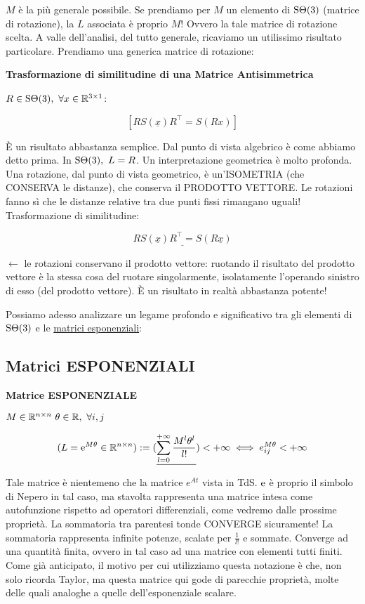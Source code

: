 $M$ è la più generale possibile. Se prendiamo per $M$ un elemento di $\operatorname{S\Theta}(3)$ (matrice di rotazione), la $L$ associata è proprio $M$! Ovvero la tale matrice di rotazione scelta. A valle dell'analisi, del tutto generale, ricaviamo un utilissimo risultato particolare. Prendiamo una generica matrice di rotazione:

\begin{corl}{\textbf{Trasformazione di similitudine di una Matrice Antisimmetrica}}

$R\in\operatorname{S\Theta}(3),\ \forall x\in\mathbb{R}^{3\times 1}$:

\[
	[RS(\underline{x})R^\top = S(Rx)]
\]

\end{corl}

\`E un risultato abbastanza semplice. Dal punto di vista algebrico è come abbiamo detto prima. In $\SO(3),\ L=R$. Un interpretazione geometrica è molto profonda. Una rotazione, dal punto di vista geometrico, è un'ISOMETRIA (che CONSERVA le distanze), che conserva il PRODOTTO VETTORE. Le rotazioni fanno sì che le distanze relative tra due punti fissi rimangano uguali! Trasformazione di similitudine:

\[
	\underline{RS(\underline{x})R^\top = S(R\underline{x})}
\]

$\leftarrow$ le rotazioni conservano il prodotto vettore: ruotando il risultato del prodotto vettore è la stessa cosa del ruotare singolarmente, isolatamente l'operando sinistro di esso (del prodotto vettore). \`E un risultato in realtà abbastanza potente!

Possiamo adesso analizzare un legame profondo e significativo tra gli elementi di $\operatorname{S\Theta}(3)$ e le \underline{matrici esponenziali}:

\subsection{Matrici ESPONENZIALI}

\begin{defn}{\textbf{Matrice ESPONENZIALE}}

$M\in\mathbb{R}^{n\times n}\ \theta\in\mathbb{R},\ \forall i,j$

\[
	(L = \mathop{}\!\mathrm{e}^{M\theta}\in\mathbb{R}^{n\times n}) := (\underline{\sum_{l=0}^{+\infty}{\frac{M^l\theta^l}{l!}}}) < +\infty \iff e^{M\theta}_{ij} <+\infty
\]

\end{defn}

Tale matrice è nientemeno che la matrice $e^{At}$ vista in TdS. $\mathop{}\!\mathrm{e}$ è proprio il simbolo di Nepero in tal caso, ma stavolta rappresenta una matrice intesa come autofunzione rispetto ad operatori differenziali, come vedremo dalle prossime proprietà.
La sommatoria tra parentesi tonde CONVERGE sicuramente! La sommatoria rappresenta infinite potenze, scalate per $\frac{1}{l!}$ e sommate. Converge ad una quantità finita, ovvero in tal caso ad una matrice con elementi tutti finiti. Come già anticipato, il motivo per cui utilizziamo questa notazione è che, non solo ricorda Taylor, ma questa matrice qui gode di parecchie proprietà, molte delle quali analoghe a quelle dell'esponenziale scalare.

